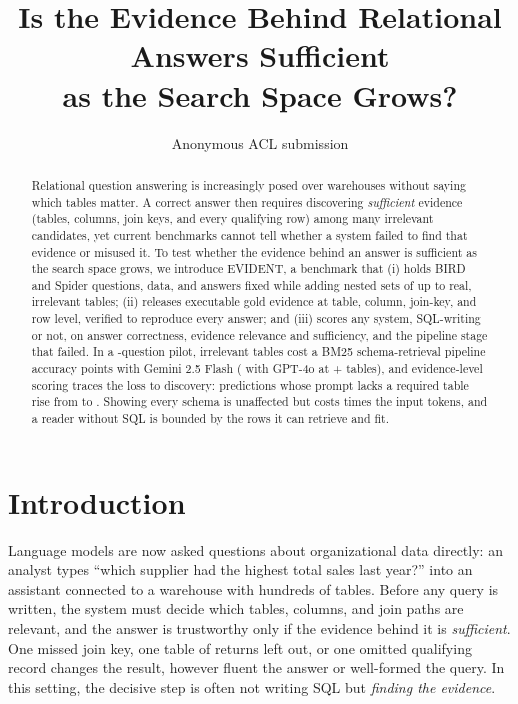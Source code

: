 \documentclass[11pt]{article}
\title{Is the Evidence Behind Relational Answers Sufficient\\
as the Search Space Grows?}
\author{Anonymous ACL submission}
\newcommand{\benchmark}{\mbox{EVIDENT}}  %
\begin{document}
\maketitle

\begin{abstract}
Relational question answering is increasingly posed over warehouses without saying which tables matter. A correct answer then requires discovering \emph{sufficient} evidence (tables, columns, join keys, and every qualifying row) among many irrelevant candidates, yet current benchmarks cannot tell whether a system failed to find that evidence or misused it. To test whether the evidence behind an answer is sufficient as the search space grows, we introduce \benchmark, a benchmark that (i) holds BIRD and Spider questions, data, and answers fixed while adding nested sets of up to \topLevel{} real, irrelevant tables; (ii) releases executable gold evidence at table, column, join-key, and row level, verified to reproduce every answer; and (iii) scores any system, SQL-writing or not, on answer correctness, evidence relevance and sufficiency, and the pipeline stage that failed. In a \nQuestions-question pilot, irrelevant tables cost a BM25 schema-retrieval pipeline \bmDeltaAbsTop{} accuracy points with Gemini 2.5 Flash (\gpBmDeltaAbs{} with GPT-4o at +\gpCommonTop{} tables), and evidence-level scoring traces the loss to discovery: predictions whose prompt lacks a required table rise from \bmMissedZeroP{} to \bmMissedTopP{}. Showing every schema is unaffected but costs \tokRatioTop{} times the input tokens, and a reader without SQL is bounded by the rows it can retrieve and fit.
\end{abstract}

\section{Introduction}\label{sec:intro}
Language models are now asked questions about organizational data directly: an analyst types ``which supplier had the highest total sales last year?'' into an assistant connected to a warehouse with hundreds of tables. Before any query is written, the system must decide which tables, columns, and join paths are relevant, and the answer is trustworthy only if the evidence behind it is \emph{sufficient}. One missed join key, one table of returns left out, or one omitted qualifying record changes the result, however fluent the answer or well-formed the query. In this setting, the decisive step is often not writing SQL but \emph{finding the evidence}.
\end{document}
